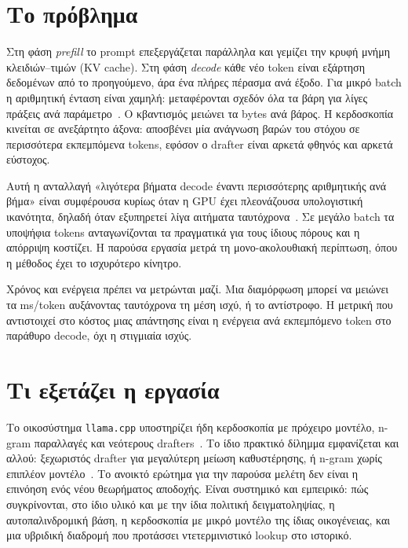 \documentclass[a4paper,12pt]{report}
\theoremstyle{plain}
\theoremstyle{definition}
\theoremstyle{remark}
\begin{document}
\section{Το πρόβλημα}

Στη φάση \emph{prefill} το prompt επεξεργάζεται παράλληλα και γεμίζει την
κρυφή μνήμη κλειδιών--τιμών (KV cache). Στη φάση \emph{decode} κάθε νέο token
είναι εξάρτηση δεδομένων από το προηγούμενο, άρα ένα πλήρες πέρασμα ανά
έξοδο. Για μικρό batch η αριθμητική ένταση είναι χαμηλή: μεταφέρονται σχεδόν
όλα τα βάρη για λίγες πράξεις ανά παράμετρο~\cite{pope2023efficiently}. Ο
κβαντισμός μειώνει τα bytes ανά βάρος. Η κερδοσκοπία κινείται σε ανεξάρτητο
άξονα: αποσβένει μία ανάγνωση βαρών του στόχου σε περισσότερα εκπεμπόμενα
tokens, εφόσον ο drafter είναι αρκετά φθηνός και αρκετά εύστοχος.

Αυτή η ανταλλαγή «λιγότερα βήματα decode έναντι περισσότερης αριθμητικής ανά
βήμα» είναι συμφέρουσα κυρίως όταν η GPU έχει πλεονάζουσα υπολογιστική
ικανότητα, δηλαδή όταν εξυπηρετεί λίγα αιτήματα
ταυτόχρονα~\cite{vllm-speculative-docs}.
Σε μεγάλο batch τα υποψήφια tokens ανταγωνίζονται τα πραγματικά για τους ίδιους
πόρους και η απόρριψη κοστίζει. Η παρούσα εργασία μετρά τη μονο-ακολουθιακή
περίπτωση, όπου η μέθοδος έχει το ισχυρότερο κίνητρο.

Χρόνος και ενέργεια πρέπει να μετρώνται μαζί. Μια διαμόρφωση μπορεί να
μειώνει τα ms/token αυξάνοντας ταυτόχρονα τη μέση ισχύ, ή το αντίστροφο. Η
μετρική που αντιστοιχεί στο κόστος μιας απάντησης είναι η ενέργεια ανά
εκπεμπόμενο token στο παράθυρο decode, όχι η στιγμιαία ισχύς.

\section{Τι εξετάζει η εργασία}

Το οικοσύστημα \texttt{llama.cpp} υποστηρίζει ήδη κερδοσκοπία με πρόχειρο
μοντέλο, n-gram παραλλαγές και νεότερους drafters~\cite{llamacpp-speculative}.
Το ίδιο πρακτικό δίλημμα εμφανίζεται και αλλού: ξεχωριστός drafter
για μεγαλύτερη
μείωση καθυστέρησης, ή n-gram χωρίς επιπλέον
μοντέλο~\cite{vllm-speculative-docs}.
Το ανοικτό ερώτημα για την παρούσα μελέτη δεν είναι η επινόηση ενός νέου
θεωρήματος αποδοχής. Είναι συστημικό και εμπειρικό: πώς συγκρίνονται, στο
ίδιο υλικό και με την ίδια πολιτική δειγματοληψίας, η αυτοπαλινδρομική βάση,
η κερδοσκοπία με μικρό μοντέλο της ίδιας οικογένειας, και μια υβριδική
διαδρομή που προτάσσει ντετερμινιστικό lookup στο ιστορικό.
\end{document}
